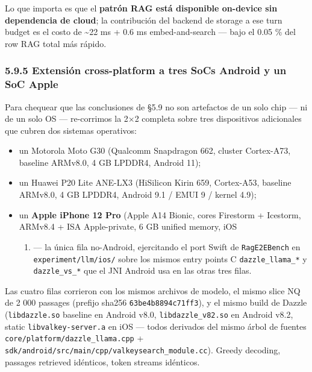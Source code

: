 Lo que importa es que el \textbf{patrón RAG está disponible on-device sin
dependencia de cloud}; la contribución del backend de storage a ese turn budget
es el costo de \textasciitilde22 ms + 0.6 ms embed-and-search --- bajo el 0.05
\% del row RAG total más rápido.

\subsubsection{5.9.5 Extensión cross-platform a tres SoCs Android y un SoC
Apple}\label{extensiuxf3n-cross-platform-a-tres-socs-android-y-un-soc-apple}

Para chequear que las conclusiones de §5.9 no son artefactos de un solo chip ---
ni de un solo OS --- re-corrimos la 2×2 completa sobre tres dispositivos
adicionales que cubren dos sistemas operativos:

\begin{itemize}
\tightlist
\item
  un Motorola Moto G30 (Qualcomm Snapdragon 662, cluster Cortex-A73, baseline
  ARMv8.0, 4 GB LPDDR4, Android 11);
\item
  un Huawei P20 Lite ANE-LX3 (HiSilicon Kirin 659, Cortex-A53, baseline ARMv8.0,
  4 GB LPDDR4, Android 9.1 / EMUI 9 / kernel 4.9);
\item
  un \textbf{Apple iPhone 12 Pro} (Apple A14 Bionic, cores Firestorm + Icestorm,
  ARMv8.4 + ISA Apple-private, 6 GB unified memory, iOS

  \begin{enumerate}
  \def\labelenumi{\arabic{enumi})}
  \setcounter{enumi}{25}
  \tightlist
  \item
    --- la única fila no-Android, ejercitando el port Swift de
    \texttt{RagE2EBench} en \texttt{experiment/llm/ios/} sobre los mismos entry
    points C \texttt{dazzle\_llama\_*} y \texttt{dazzle\_vs\_*} que el JNI
    Android usa en las otras tres filas.
  \end{enumerate}
\end{itemize}

Las cuatro filas corrieron con los mismos archivos de modelo, el mismo slice NQ
de 2 000 passages (prefijo sha256 \texttt{63be4b8894c71ff3}), y el mismo build
de Dazzle (\texttt{libdazzle.so} baseline en Android v8.0,
\texttt{libdazzle\_v82.so} en Android v8.2, static \texttt{libvalkey-server.a}
en iOS --- todos derivados del mismo árbol de fuentes
\texttt{core/platform/dazzle\_llama.cpp} +
\texttt{sdk/android/src/main/cpp/valkeysearch\_module.cc}). Greedy decoding,
passages retrieved idénticos, token streams idénticos.

